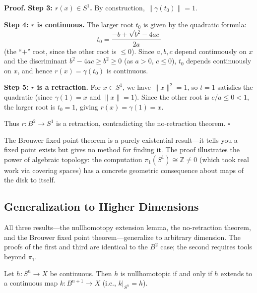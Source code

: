 \documentclass[11pt]{report}
\renewenvironment{proof}[1][Proof]{\noindent\textbf{#1.} }{\hfill$\square$\par\vspace{5pt}}
\begin{document}
\begin{proof}
\textbf{Step 3: $r(x) \in S^1$.} By construction, $\|\gamma(t_0)\| = 1$.

\textbf{Step 4: $r$ is continuous.} The larger root $t_0$ is given by the quadratic formula:
\[t_0 = \frac{-b + \sqrt{b^2 - 4ac}}{2a}\]
(the ``$+$'' root, since the other root is $\leq 0$). Since $a, b, c$ depend continuously on $x$ and the discriminant $b^2 - 4ac \geq b^2 \geq 0$ (as $a > 0$, $c \leq 0$), $t_0$ depends continuously on $x$, and hence $r(x) = \gamma(t_0)$ is continuous.

\textbf{Step 5: $r$ is a retraction.} For $x \in S^1$, we have $\|x\|^2 = 1$, so $t = 1$ satisfies the quadratic (since $\gamma(1) = x$ and $\|x\| = 1$). Since the other root is $c/a \leq 0 < 1$, the larger root is $t_0 = 1$, giving $r(x) = \gamma(1) = x$.

Thus $r: B^2 \to S^1$ is a retraction, contradicting the no-retraction theorem.
\end{proof}

\begin{rembox}
The Brouwer fixed point theorem is a purely existential result---it tells you a fixed point exists but gives no method for finding it. The proof illustrates the power of algebraic topology: the computation $\pi_1(S^1) \cong \mathbb{Z} \neq 0$ (which took real work via covering spaces) has a concrete geometric consequence about maps of the disk to itself.
\end{rembox}

\subsection{Generalization to Higher Dimensions}

All three results---the nullhomotopy extension lemma, the no-retraction theorem, and the Brouwer fixed point theorem---generalize to arbitrary dimension. The proofs of the first and third are identical to the $B^2$ case; the second requires tools beyond $\pi_1$.

\begin{lembox}
Let $h: S^n \to X$ be continuous. Then $h$ is nullhomotopic if and only if $h$ extends to a continuous map $k: B^{n+1} \to X$ (i.e., $k|_{S^n} = h$).
\end{lembox}
\end{document}
